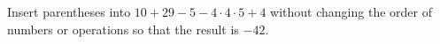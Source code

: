 Insert parentheses into $10+29-5-4\cdot4\cdot5+4$ without changing the order of numbers or operations so that the result is $-42$.
